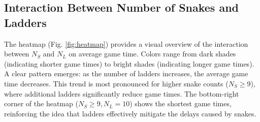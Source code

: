 %	
%	
%	
%	
\subsection{Interaction Between Number of Snakes and Ladders}

The heatmap (Fig. \ref{fig:heatmap}) provides a visual overview of the interaction between $N_S$ and $N_L$ on average game time. Colors range from dark shades (indicating shorter game times) to bright shades (indicating longer game times). A clear pattern emerges: as the number of ladders increases, the average game time decreases. This trend is most pronounced for higher snake counts ($N_S \geq 9$), where additional ladders significantly reduce game times. The bottom-right corner of the heatmap ($N_S \geq 9, N_L = 10$) shows the shortest game times, reinforcing the idea that ladders effectively mitigate the delays caused by snakes.

